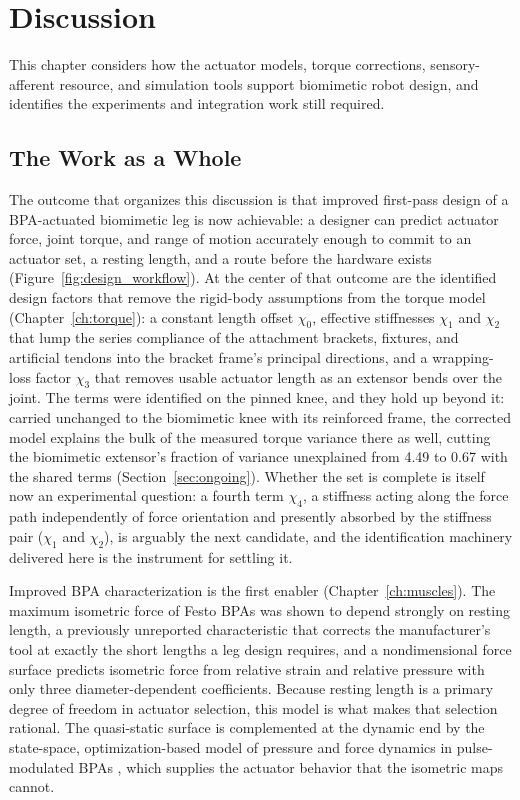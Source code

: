 \chapter{Discussion}\label{ch:overall}\label{ch:futurework}
\graphicspath{{../Figures/70-overall/}{figs/70-overall/}}

This chapter considers how the actuator models, torque corrections, sensory-afferent resource, and simulation tools support biomimetic robot design, and identifies the experiments and integration work still required.

\section{The Work as a Whole}\label{sec:foundation}

The outcome that organizes this discussion is that improved first-pass design of a BPA-actuated biomimetic leg is now achievable: a designer can predict actuator force, joint torque, and range of motion accurately enough to commit to an actuator set, a resting length, and a route before the hardware exists (Figure~\ref{fig:design_workflow}). At the center of that outcome are the identified design factors that remove the rigid-body assumptions from the torque model (Chapter~\ref{ch:torque}): a constant length offset $\chi_{0}$, effective stiffnesses $\chi_{1}$ and $\chi_{2}$ that lump the series compliance of the attachment brackets, fixtures, and artificial tendons into the bracket frame's principal directions, and a wrapping-loss factor $\chi_{3}$ that removes usable actuator length as an extensor bends over the joint. The terms were identified on the pinned knee, and they hold up beyond it: carried unchanged to the biomimetic knee with its reinforced frame, the corrected model explains the bulk of the measured torque variance there as well, cutting the biomimetic extensor's fraction of variance unexplained from 4.49 to 0.67 with the shared terms (Section~\ref{sec:ongoing}). Whether the set is complete is itself now an experimental question: a fourth term $\chi_{4}$, a stiffness acting along the force path independently of force orientation and presently absorbed by the stiffness pair ($\chi_{1}$ and $\chi_{2}$), is arguably the next candidate, and the identification machinery delivered here is the instrument for settling it.

Improved BPA characterization is the first enabler (Chapter~\ref{ch:muscles}). The maximum isometric force of Festo BPAs was shown to depend strongly on resting length, a previously unreported characteristic that corrects the manufacturer's tool at exactly the short lengths a leg design requires, and a nondimensional force surface predicts isometric force from relative strain and relative pressure with only three diameter-dependent coefficients. Because resting length is a primary degree of freedom in actuator selection, this model is what makes that selection rational. The quasi-static surface is complemented at the dynamic end by the state-space, optimization-based model of pressure and force dynamics in pulse-modulated BPAs \citep{elzein_pressure_2025}, which supplies the actuator behavior that the isometric maps cannot.

